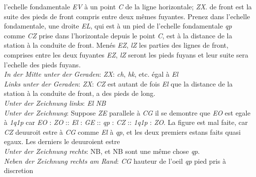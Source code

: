 l'echelle\protect{} fondamentale \textit{EV} \`{a} un point \textit{C} de la ligne horizontale; \textit{ZX}.\protect{} de front est la suite des pieds de front compris entre deux mêmes fuyantes. Prenez dans l'echelle\protect{} fondamentale, une droite \textit{EL}, qui est \`{a} un pied de l'echelle\protect{} fondamentale \textit{qp} comme \textit{CZ} prise dans l'horizontale depuis le point \textit{C}, est \`{a} la distance de la station \`{a} la conduite de front. Men\'{e}s \textit{EZ}, \textit{lZ } les parties des lignes de front, comprises entre les deux fuyantes \textit{EZ}, \textit{lZ} seront les pieds fuyans et leur suite sera l'echelle\protect{} des pieds fuyans.\\ \textit{In der Mitte unter der Geraden}: \textit{ZX}: \textit{ch}, \textit{hk}, etc. \'{e}gal \`{a} \textit{El}\\ \textit{Links unter der Geraden}: \textit{ZX}: \textit{CZ} est autant de fois \textit{El} que la distance de la station \`{a} la conduite de front, a des pieds de long.\\ \textit{Unter der Zeichnung links}: \textit{El} \textit{NB}\\ \textit{Unter der Zeichnung}: Suppose \textit{ZE} parallele \`{a} \textit{CG} il se demontre que \textit{EO} est egale \`{a} \textit{1q1p} car \textit{EO} : \textit{ZO} :: \textit{El} : \textit{GE} :: \textit{qp} : \textit{CZ} :: \textit{1q1p} : \textit{ZO}. La figure est mal faite, car \textit{CZ} deuuroit estre \`{a} \textit{CG} comme \textit{El} \`{a} \textit{qp}, et les deux premiers estans faits quasi egaux. Les derniers le deuuroient estre \\ \textit{Unter der Zeichnung rechts}:  NB, et  NB sont une même chose \textit{qp}.\\ \textit{Neben der Zeichnung rechts am Rand}: \textit{CG} hauteur de l'oeil \textit{qp} pied  pris \`{a} discretion\\

